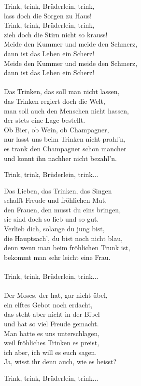 \vspace{10pt}
Trink, trink, Brüderlein, trink,\\
lass doch die Sorgen zu Haus!\\
Trink, trink, Brüderlein, trink,\\
zieh doch die Stirn nicht so krauss!\\
Meide den Kummer und meide den Schmerz,\\
dann ist das Leben ein Scherz!\\
Meide den Kummer und meide den Schmerz,\\
dann ist das Leben ein Scherz!\\
\\
Das Trinken, das soll man nicht lassen,\\
das Trinken regiert doch die Welt,\\
man soll auch den Menschen nicht hassen,\\
der stets eine Lage bestellt.\\
Ob Bier, ob Wein, ob Champagner,\\
nur lasst uns beim Trinken nicht prahl'n,\\
es trank den Champagner schon mancher\\
und konnt ihn nachher nicht bezahl'n.\par
\vspace{10pt}
Trink, trink, Brüderlein, trink...\par
\vspace{10pt}
Das Lieben, das Trinken, das Singen\\
schafft Freude und fröhlichen Mut,\\
den Frauen, den musst du eins bringen,\\
sie sind doch so lieb und so gut.\\
Verlieb dich, solange du jung bist,\\
die Hauptsach', du bist noch nicht blau,\\
denn wenn man beim fröhlichen Trunk ist,\\
bekommt man sehr leicht eine Frau.\\
\\
Trink, trink, Brüderlein, trink...\\
\\
Der Moses, der hat, gar nicht übel,\\
ein elftes Gebot noch erdacht,\\
das steht aber nicht in der Bibel\\
und hat so viel Freude gemacht.\\
Man hatte es uns unterschlagen,\\
weil fröhliches Trinken es preist,\\
ich aber, ich will es euch sagen.\\
Ja, wisst ihr denn auch, wie es heisst?\par
\vspace{10pt}
Trink, trink, Brüderlein, trink...
